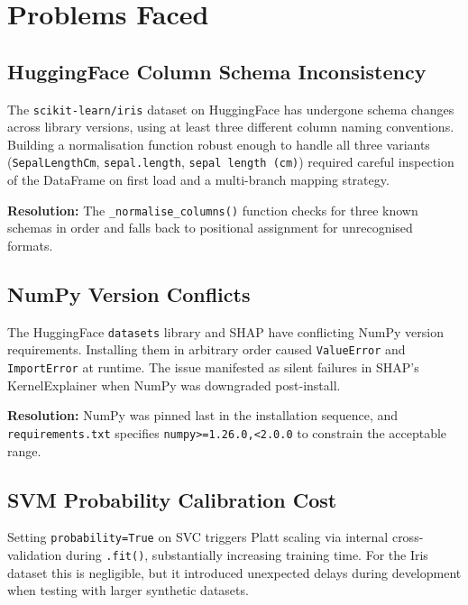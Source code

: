 \documentclass[12pt, a4paper]{report}
\newcommand{\code}[1]{\texttt{\small\textcolor{primary}{#1}}}
\begin{document}
\chapter{Problems Faced}

\section{HuggingFace Column Schema Inconsistency}

The \code{scikit-learn/iris} dataset on HuggingFace has undergone schema changes across
library versions, using at least three different column naming conventions. Building a
normalisation function robust enough to handle all three variants
(\code{SepalLengthCm}, \code{sepal.length}, \code{sepal length (cm)}) required careful
inspection of the DataFrame on first load and a multi-branch mapping strategy.

\textbf{Resolution:} The \code{\_normalise\_columns()} function checks for three known
schemas in order and falls back to positional assignment for unrecognised formats.

\section{NumPy Version Conflicts}

The HuggingFace \code{datasets} library and SHAP have conflicting NumPy version
requirements. Installing them in arbitrary order caused \code{ValueError} and
\code{ImportError} at runtime. The issue manifested as silent failures in SHAP's
KernelExplainer when NumPy was downgraded post-install.

\textbf{Resolution:} NumPy was pinned last in the installation sequence, and
\code{requirements.txt} specifies \code{numpy>=1.26.0,<2.0.0} to constrain the
acceptable range.

\section{SVM Probability Calibration Cost}

Setting \code{probability=True} on SVC triggers Platt scaling via internal
cross-validation during \code{.fit()}, substantially increasing training time. For the
Iris dataset this is negligible, but it introduced unexpected delays during development
when testing with larger synthetic datasets.
\end{document}
